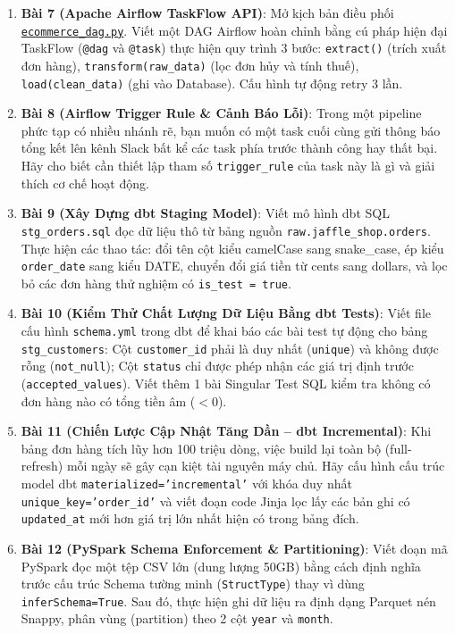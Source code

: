 \begin{baitapbox}
\begin{enumerate}
    \item \textbf{Bài 7 (Apache Airflow TaskFlow API)}: Mở kịch bản điều phối \href{run:./code/ch08_orchestration/ecommerce_dag.py}{\texttt{ecommerce\_dag.py}}. Viết một DAG Airflow hoàn chỉnh bằng cú pháp hiện đại TaskFlow (\texttt{@dag} và \texttt{@task}) thực hiện quy trình 3 bước: \texttt{extract()} (trích xuất đơn hàng), \texttt{transform(raw\_data)} (lọc đơn hủy và tính thuế), \texttt{load(clean\_data)} (ghi vào Database). Cấu hình tự động retry 3 lần.
    \item \textbf{Bài 8 (Airflow Trigger Rule \& Cảnh Báo Lỗi)}: Trong một pipeline phức tạp có nhiều nhánh rẽ, bạn muốn có một task cuối cùng gửi thông báo tổng kết lên kênh Slack bất kể các task phía trước thành công hay thất bại. Hãy cho biết cần thiết lập tham số \texttt{trigger\_rule} của task này là gì và giải thích cơ chế hoạt động.
    \item \textbf{Bài 9 (Xây Dựng dbt Staging Model)}: Viết mô hình dbt SQL \texttt{stg\_orders.sql} đọc dữ liệu thô từ bảng nguồn \texttt{raw.jaffle\_shop.orders}. Thực hiện các thao tác: đổi tên cột kiểu camelCase sang snake\_case, ép kiểu \texttt{order\_date} sang kiểu DATE, chuyển đổi giá tiền từ cents sang dollars, và lọc bỏ các đơn hàng thử nghiệm có \texttt{is\_test = true}.
    \item \textbf{Bài 10 (Kiểm Thử Chất Lượng Dữ Liệu Bằng dbt Tests)}: Viết file cấu hình \texttt{schema.yml} trong dbt để khai báo các bài test tự động cho bảng \texttt{stg\_customers}: Cột \texttt{customer\_id} phải là duy nhất (\texttt{unique}) và không được rỗng (\texttt{not\_null}); Cột \texttt{status} chỉ được phép nhận các giá trị định trước (\texttt{accepted\_values}). Viết thêm 1 bài Singular Test SQL kiểm tra không có đơn hàng nào có tổng tiền âm ($< 0$).
    \item \textbf{Bài 11 (Chiến Lược Cập Nhật Tăng Dần -- dbt Incremental)}: Khi bảng đơn hàng tích lũy hơn 100 triệu dòng, việc build lại toàn bộ (full-refresh) mỗi ngày sẽ gây cạn kiệt tài nguyên máy chủ. Hãy cấu hình cấu trúc model dbt \texttt{materialized='incremental'} với khóa duy nhất \texttt{unique\_key='order\_id'} và viết đoạn code Jinja lọc lấy các bản ghi có \texttt{updated\_at} mới hơn giá trị lớn nhất hiện có trong bảng đích.
    \item \textbf{Bài 12 (PySpark Schema Enforcement \& Partitioning)}: Viết đoạn mã PySpark đọc một tệp CSV lớn (dung lượng 50GB) bằng cách định nghĩa trước cấu trúc Schema tường minh (\texttt{StructType}) thay vì dùng \texttt{inferSchema=True}. Sau đó, thực hiện ghi dữ liệu ra định dạng Parquet nén Snappy, phân vùng (partition) theo 2 cột \texttt{year} và \texttt{month}.

\end{enumerate}
\end{baitapbox}

